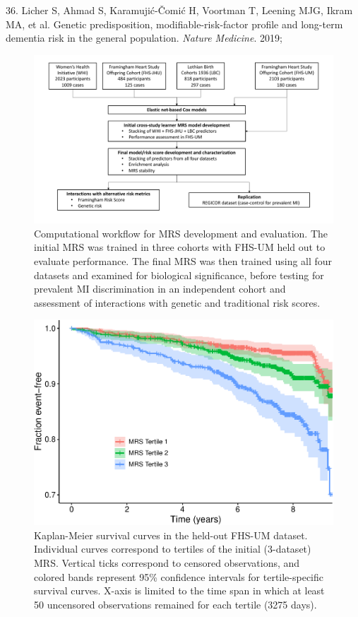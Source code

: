 \documentclass[]{article}
\begin{document}
\leavevmode\hypertarget{ref-Licher2019}{}%
36. Licher S, Ahmad S, Karamujić-Čomić H, Voortman T, Leening MJG, Ikram
MA, et al. Genetic predisposition, modifiable-risk-factor profile and
long-term dementia risk in the general population. \emph{Nature
Medicine}. 2019;

\newpage

\begin{figure}
\centering
\includegraphics{workflow.pdf}
\caption{Computational workflow for MRS development and evaluation. The
initial MRS was trained in three cohorts with FHS-UM held out to
evaluate performance. The final MRS was then trained using all four
datasets and examined for biological significance, before testing for
prevalent MI discrimination in an independent cohort and assessment of
interactions with genetic and traditional risk scores.}
\end{figure}

\begin{figure}
\centering
\includegraphics{figures/show-km-plot-1.pdf}
\caption{Kaplan-Meier survival curves in the held-out FHS-UM dataset.
Individual curves correspond to tertiles of the initial (3-dataset) MRS.
Vertical ticks correspond to censored observations, and colored bands
represent 95\% confidence intervals for tertile-specific survival
curves. X-axis is limited to the time span in which at least 50
uncensored observations remained for each tertile (3275 days).}
\end{figure}
\end{document}
